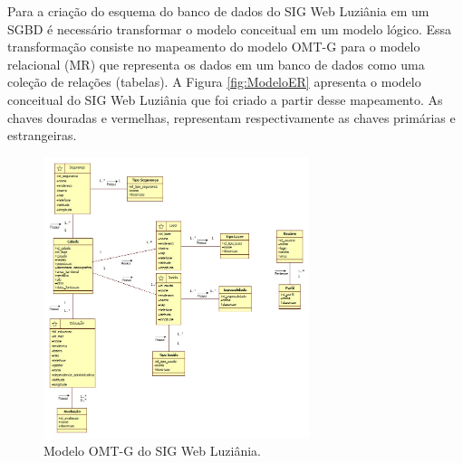 Para a criação do esquema do banco de dados do SIG Web Luziânia em um SGBD é necessário transformar o modelo conceitual em um modelo lógico. Essa transformação consiste no mapeamento do modelo OMT-G para o modelo relacional (MR) que representa os dados em um banco de dados como uma coleção de relações (tabelas). A Figura \ref{fig:ModeloER} apresenta o modelo conceitual do SIG Web Luziânia que foi criado a partir desse mapeamento. As chaves douradas e vermelhas, representam respectivamente as chaves primárias e estrangeiras.

\newpage

\begin{figure}[h]
\centering
\includegraphics[width=0.69\textwidth]{./img/cap_IV/1-DiagramaOMTG}
\caption{Modelo OMT-G do SIG Web Luziânia.}
\label{fig:DiagramaOMTG}
\end{figure}

